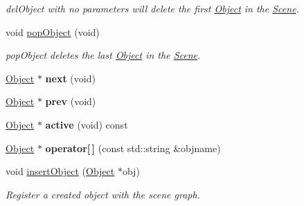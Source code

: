 \begin{DoxyCompactItemize}
\begin{DoxyCompactList}\small\item\em del\-Object with no parameters will delete the first \hyperlink{class_object}{Object} in the \hyperlink{class_scene}{Scene}. \end{DoxyCompactList}\item 
\hypertarget{class_scene_ad6c9d1d1d0c786d39bf97dc60410e28b}{void \hyperlink{class_scene_ad6c9d1d1d0c786d39bf97dc60410e28b}{pop\-Object} (void)}\label{class_scene_ad6c9d1d1d0c786d39bf97dc60410e28b}

\begin{DoxyCompactList}\small\item\em pop\-Object deletes the last \hyperlink{class_object}{Object} in the \hyperlink{class_scene}{Scene}. \end{DoxyCompactList}\item 
\hypertarget{class_scene_a70fcdad192a4c6ff508125de8af6cf4d}{\hyperlink{class_object}{Object} $\ast$ {\bfseries next} (void)}\label{class_scene_a70fcdad192a4c6ff508125de8af6cf4d}

\item 
\hypertarget{class_scene_ac852d5d763eb35b4908c9aa7ea54d1ae}{\hyperlink{class_object}{Object} $\ast$ {\bfseries prev} (void)}\label{class_scene_ac852d5d763eb35b4908c9aa7ea54d1ae}

\item 
\hypertarget{class_scene_ad0ea1a6bcf7815c63988bd937f06eb23}{\hyperlink{class_object}{Object} $\ast$ {\bfseries active} (void) const }\label{class_scene_ad0ea1a6bcf7815c63988bd937f06eb23}

\item 
\hypertarget{class_scene_ae9b69d8db8a46991017635f22e45baad}{\hyperlink{class_object}{Object} $\ast$ {\bfseries operator\mbox{[}$\,$\mbox{]}} (const std\-::string \&objname)}\label{class_scene_ae9b69d8db8a46991017635f22e45baad}

\item 
void \hyperlink{class_scene_a8893899f0088a72642ae32a656252e7f}{insert\-Object} (\hyperlink{class_object}{Object} $\ast$obj)
\begin{DoxyCompactList}\small\item\em Register a created object with the scene graph. \end{DoxyCompactList}\end{DoxyCompactItemize}
